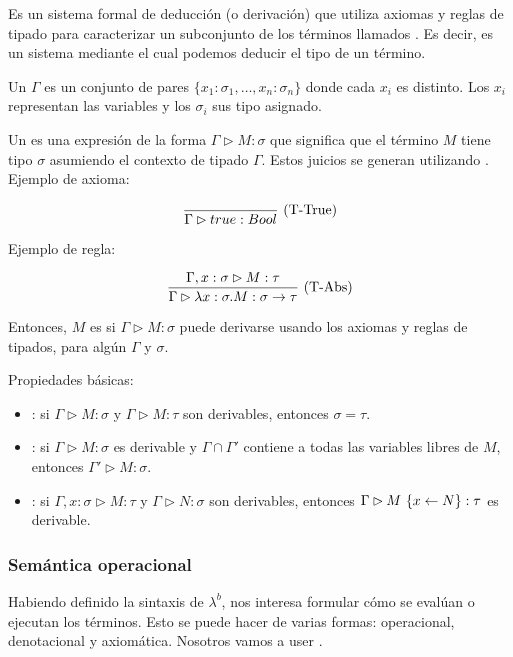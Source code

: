 Es un sistema formal de deducción (o derivación) que utiliza axiomas y reglas de tipado para caracterizar un subconjunto de los términos llamados . Es decir, es un sistema mediante el cual podemos deducir el tipo de un término.

Un  $\Gamma$ es un conjunto de pares $\{x_1:\sigma_1,\dots,x_n:\sigma_n\}$ donde cada $x_i$ es distinto. Los $x_i$ representan las variables y los $\sigma_i$ sus tipo asignado.

Un  es una expresión de la forma $\Gamma \rhd M : \sigma$ que significa que el término $M$ tiene tipo $\sigma$ asumiendo el contexto de tipado $\Gamma$. Estos juicios se generan utilizando . Ejemplo de axioma:

\[\frac{}{\Gamma \rhd true : Bool}\ \text{(T-True)}\]

Ejemplo de regla:

\[\frac{\Gamma, x : \sigma \rhd M : \tau}{\Gamma \rhd \lambda x:\sigma.M:\sigma\to\tau}\ \text{(T-Abs)}\]

\vspace{0.5em}
Entonces, $M$ es   si $\Gamma \rhd M : \sigma$ puede derivarse usando los axiomas y reglas de tipados, para algún $\Gamma$ y $\sigma$.

Propiedades básicas:

\begin{itemize}
  \item {}: si $\Gamma \rhd M : \sigma$ y $\Gamma \rhd M : \tau$ son derivables, entonces $\sigma = \tau$.
  \item {}: si $\Gamma \rhd M : \sigma$ es derivable y $\Gamma \cap \Gamma'$ contiene a todas las variables libres de $M$, entonces $\Gamma' \rhd M : \sigma$.
  \item {}: si $\Gamma,x:\sigma \rhd M : \tau$ y $\Gamma \rhd N : \sigma$ son derivables, entonces $\Gamma \rhd M\ \{x\leftarrow N\} : \tau$ es derivable.
\end{itemize}

\subsubsection{Semántica operacional}

Habiendo definido la sintaxis de $\lambda^b$, nos interesa formular cómo se evalúan o ejecutan los términos. Esto se puede hacer de varias formas: operacional, denotacional y axiomática. Nosotros vamos a user .

